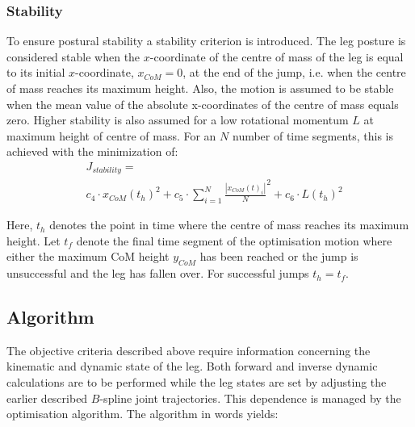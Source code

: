 \documentclass[letterpaper, 10 pt, conference]{ieeeconf}  %
\begin{document}
\subsubsection{Stability}
To ensure postural stability a stability criterion is introduced. The leg posture is considered stable when the $x$-coordinate of the centre of mass of the leg is equal to its initial $x$-coordinate, $x_{CoM}=0$, at the end of the jump, i.e. when the centre of mass reaches its maximum height. Also, the motion is assumed to be stable when the mean value of the absolute x-coordinates of the centre of mass equals zero. Higher stability is also assumed for a low rotational momentum $L$ at maximum height of centre of mass. For an $N$ number of time segments, this is achieved with the minimization of:
 \begin{equation}
 \begin{aligned}
&J_{stability}  =  \\ & c_4\cdot x_{CoM}(t_h)^2  +c_5\cdot  {\sum^{N}_{i=1}\frac{| x_{CoM}(t)_i |}{N}}^2   
				  + c_6  \cdot   L(t_h)^2
 \end{aligned}
 \end{equation}
 
Here, $t_h$ denotes the point in time where the centre of mass reaches its maximum height. Let $t_f$ denote the final time segment of the optimisation motion where either the maximum CoM height $y_{CoM}$ has been reached or the jump is unsuccessful and the leg has fallen over. For successful jumps $t_h=t_f$. \\

\subsection{Algorithm}

The objective criteria described above require information concerning the kinematic and dynamic state of the leg. Both forward and inverse dynamic calculations are to be performed while the leg states are set by adjusting the earlier described $B$-spline joint trajectories. This dependence is managed by the optimisation algorithm. The algorithm in words yields:\\
\end{document}
